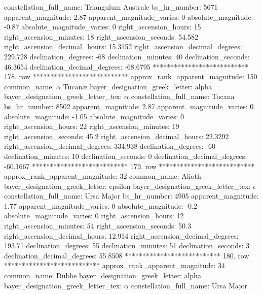            constellation_full_name: Triangulum Australe
                      bs_hr_number: 5671
                apparent_magnitude: 2.87
         apparent_magnitude_varies: 0
                absolute_magnitude: -0.87
         absolute_magnitude_varies: 0
             right_ascension_hours: 15
           right_ascension_minutes: 18
           right_ascension_seconds: 54.582
     right_ascension_decimal_hours: 15.3152
   right_ascension_decimal_degrees: 229.728
               declination_degrees: -68
               declination_minutes: 40
               declination_seconds: 46.3654
       declination_decimal_degrees: -68.6795
*************************** 178. row ***************************
    approx_rank_apparent_magnitude: 150
                       common_name: $\alpha$ Tucan{\ae}
    bayer_designation_greek_letter: alpha
bayer_designation_greek_letter_tex: $\alpha$
           constellation_full_name: Tucana
                      bs_hr_number: 8502
                apparent_magnitude: 2.87
         apparent_magnitude_varies: 0
                absolute_magnitude: -1.05
         absolute_magnitude_varies: 0
             right_ascension_hours: 22
           right_ascension_minutes: 19
           right_ascension_seconds: 45.2
     right_ascension_decimal_hours: 22.3292
   right_ascension_decimal_degrees: 334.938
               declination_degrees: -60
               declination_minutes: 10
               declination_seconds: 0
       declination_decimal_degrees: -60.1667
*************************** 179. row ***************************
    approx_rank_apparent_magnitude: 32
                       common_name: Alioth
    bayer_designation_greek_letter: epsilon
bayer_designation_greek_letter_tex: $\epsilon$
           constellation_full_name: Ursa Major
                      bs_hr_number: 4905
                apparent_magnitude: 1.77
         apparent_magnitude_varies: 0
                absolute_magnitude: -0.2
         absolute_magnitude_varies: 0
             right_ascension_hours: 12
           right_ascension_minutes: 54
           right_ascension_seconds: 50.3
     right_ascension_decimal_hours: 12.914
   right_ascension_decimal_degrees: 193.71
               declination_degrees: 55
               declination_minutes: 51
               declination_seconds: 3
       declination_decimal_degrees: 55.8508
*************************** 180. row ***************************
    approx_rank_apparent_magnitude: 34
                       common_name: Dubhe
    bayer_designation_greek_letter: alpha
bayer_designation_greek_letter_tex: $\alpha$
           constellation_full_name: Ursa Major
